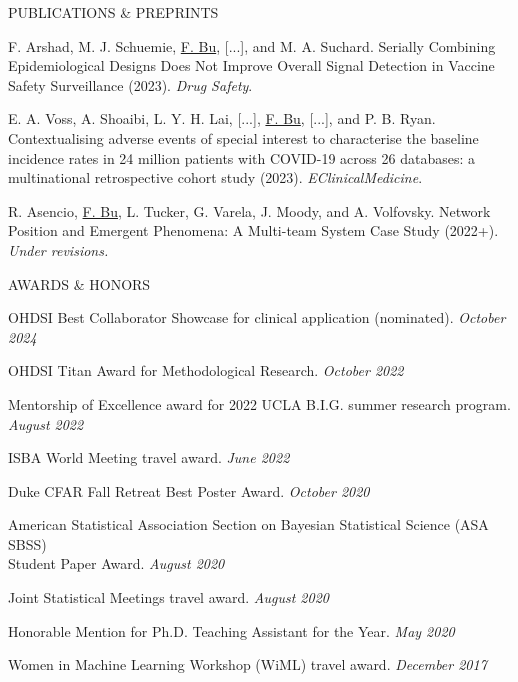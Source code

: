 \documentclass{resume} %
\newcommand{\myName}[1]{\underline{#1}}
\begin{document}
\begin{rSection}{PUBLICATIONS \& PREPRINTS}
\smallskip

F. Arshad, M. J. Schuemie, \myName{F. Bu}, [...], and M. A. Suchard. Serially Combining Epidemiological Designs Does Not Improve Overall Signal Detection in Vaccine Safety Surveillance (2023). \emph{Drug Safety}. 

\smallskip

E. A. Voss, A. Shoaibi, L. Y. H. Lai,  [...], \myName{F. Bu}, [...], and P. B. Ryan. Contextualising adverse events of special interest to characterise the baseline incidence rates in 24 million patients with COVID-19 across 26 databases: a multinational retrospective cohort study (2023). \emph{EClinicalMedicine}. 


\smallskip

R. Asencio, \myName{F. Bu}, L. Tucker, G. Varela, J. Moody, and A. Volfovsky. 
Network Position and Emergent Phenomena: A Multi-team System Case Study (2022+). \emph{Under revisions.}


\end{rSection}




%


\begin{rSection}{AWARDS \& HONORS}
	
OHDSI Best Collaborator Showcase for clinical application (nominated).
\hfill {\em October 2024}

OHDSI Titan Award for Methodological Research. 
\hfill {\em October 2022}

Mentorship of Excellence award for 2022 UCLA B.I.G. summer research program. \hfill {\em August 2022}

ISBA World Meeting travel award.
\hfill {\em June 2022}

Duke CFAR Fall Retreat Best Poster Award. 
\hfill {\em October 2020}

American Statistical Association Section on Bayesian Statistical Science (ASA SBSS) \\ Student Paper Award. 
\hfill {\em August 2020}

Joint Statistical Meetings travel award. \hfill {\em August 2020}

Honorable Mention for Ph.D. Teaching Assistant for the Year. 
\hfill {\em May 2020}

Women in Machine Learning Workshop (WiML) travel award. \hfill {\em December 2017}

\end{rSection}
\end{document}

